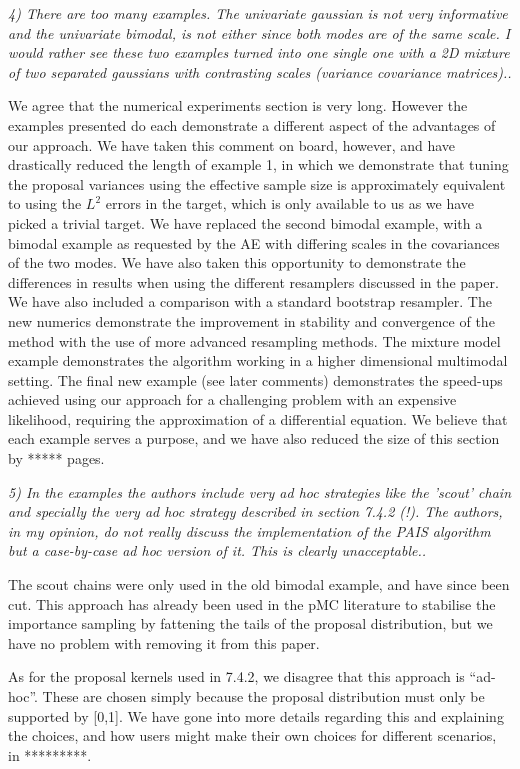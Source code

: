 \documentclass{article}
\newcommand{\comment}[2]{\vspace{0.6cm}{\bf Comment:} {\it #1.}

\vspace{0.3cm}{\bf Answer:} #2}
\begin{document}
\comment{4) There are too many examples. The univariate gaussian is not very informative and the univariate bimodal, is not either since both modes are of the same scale. I would rather see these two examples turned into one single one with a 2D mixture of two separated gaussians with contrasting scales (variance covariance matrices).}{We agree that the numerical experiments section is very long. However the examples presented do each demonstrate a different aspect of the advantages of our approach. We have taken this comment on board, however, and have drastically reduced the length of example 1, in which we demonstrate that tuning the proposal variances using the effective sample size is approximately equivalent to using the $L^2$ errors in the target, which is only available to us as we have picked a trivial target. We have replaced the second bimodal example, with a bimodal example as requested by the AE with differing scales in the covariances of the two modes. We have also taken this opportunity to demonstrate the differences in results when using the different resamplers discussed in the paper. We have also included a comparison with a standard bootstrap resampler. The new numerics demonstrate the improvement in stability and convergence of the method with the use of more advanced resampling methods. The mixture model example demonstrates the algorithm working in a higher dimensional multimodal setting. The final new example (see later comments) demonstrates the speed-ups achieved using our approach for a challenging problem with an expensive likelihood, requiring the approximation of a differential equation. We believe that each example serves a purpose, and we have also reduced the size of this section by ***** pages.}

\comment{5) In the examples the authors include very ad hoc strategies like the 'scout' chain and specially the very ad hoc strategy described in section 7.4.2 (!). The authors, in my opinion, do not really discuss the implementation of the PAIS algorithm but a case-by-case ad hoc version of it. This is clearly unacceptable.}{The scout chains were only used in the old bimodal example, and have since been cut. This approach has already been used in the pMC literature to stabilise the importance sampling by fattening the tails of the proposal distribution, but we have no problem with removing it from this paper.

  As for the proposal kernels used in 7.4.2, we disagree that this approach is ``ad-hoc''. These are chosen simply because the proposal distribution must only be supported by [0,1]. We have gone into more details regarding this and explaining the choices, and how users might make their own choices for different scenarios, in *********.}
\end{document}
